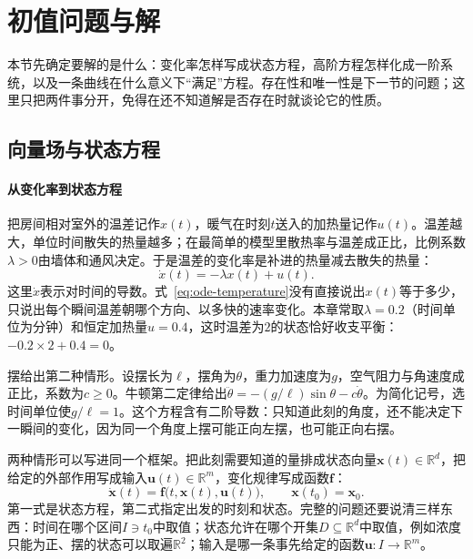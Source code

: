 
\section{初值问题与解}
\label{sec:ode-ivp}

本节先确定要解的是什么：变化率怎样写成状态方程，高阶方程怎样化成一阶系统，以及一条曲线在什么意义下“满足”方程。存在性和唯一性是下一节的问题；这里只把两件事分开，免得在还不知道解是否存在时就谈论它的性质。

\subsection{向量场与状态方程}
\label{sec:ode-vector-fields}

\paragraph{从变化率到状态方程}
把房间相对室外的温差记作$x(t)$，暖气在时刻$t$送入的加热量记作$u(t)$。温差越大，单位时间散失的热量越多；在最简单的模型里散热率与温差成正比，比例系数$\lambda>0$由墙体和通风决定。于是温差的变化率是补进的热量减去散失的热量：
\begin{equation}
  \dot x(t)=-\lambda x(t)+u(t).
  \label{eq:ode-temperature}
\end{equation}
这里$\dot x$表示对时间的导数。式~\eqref{eq:ode-temperature}没有直接说出$x(t)$等于多少，只说出每个瞬间温差朝哪个方向、以多快的速率变化。本章常取$\lambda=0.2$（时间单位为分钟）和恒定加热量$u=0.4$，这时温差为$2$的状态恰好收支平衡：$-0.2\times2+0.4=0$。

摆给出第二种情形。设摆长为$\ell$，摆角为$\theta$，重力加速度为$g$，空气阻力与角速度成正比，系数为$c\geq0$。牛顿第二定律给出$\ddot\theta=-(g/\ell)\sin\theta-c\dot\theta$。为简化记号，选时间单位使$g/\ell=1$。这个方程含有二阶导数：只知道此刻的角度，还不能决定下一瞬间的变化，因为同一个角度上摆可能正向左摆，也可能正向右摆。

两种情形可以写进同一个框架。把此刻需要知道的量排成状态向量$\bm x(t)\in\mathbb R^d$，把给定的外部作用写成输入$\bm u(t)\in\mathbb R^m$，变化规律写成函数$\bm f$：
\begin{equation}
  \dot{\bm x}(t)=\bm f\bigl(t,\bm x(t),\bm u(t)\bigr),\qquad \bm x(t_0)=\bm x_0.
  \label{eq:ode-ivp-input}
\end{equation}
第一式是状态方程，第二式指定出发的时刻和状态。完整的问题还要说清三样东西：时间在哪个区间$I\ni t_0$中取值；状态允许在哪个开集$D\subseteq\mathbb R^d$中取值，例如浓度只能为正、摆的状态可以取遍$\mathbb R^2$；输入是哪一条事先给定的函数$\bm u:I\to\mathbb R^m$。

